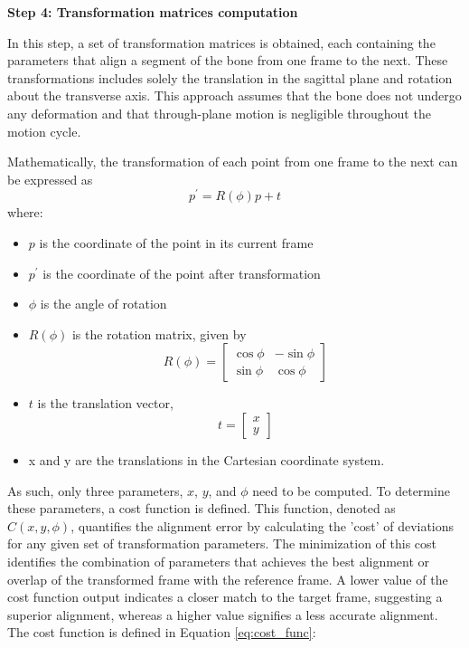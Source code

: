 \documentclass{micro-econ-thesis}
\begin{document}
\textbf{Step 4: Transformation matrices computation}

In this step, a set of transformation matrices is obtained, each containing the parameters that align a segment of the bone from one frame to the next. These transformations includes solely the translation in the sagittal plane and rotation about the transverse axis. This approach assumes that the bone does not undergo any deformation and that through-plane motion is negligible throughout the motion cycle. 

Mathematically, the transformation of each point from one frame to the next can be expressed as 
\begin{equation}
	p^{'} = R(\phi)p + t
	\label{eq:rot} 
\end{equation}
where: 
\begin{itemize}
	\item \textbf{$p$} is the coordinate of the point in its current frame
	\item \textbf{$p^{'}$} is the coordinate of the point after transformation
	\item $\phi$ is the angle of rotation
	\item \textbf{$R(\phi)$}  is the rotation matrix, given by 
	 \[
	 R(\phi) = 
	 \begin{bmatrix}
	 	\cos \phi & -\sin \phi \\
	 	\sin \phi & \cos \phi
	 \end{bmatrix}
	 \]
	 
	 \item $t$ is the translation vector,
	 	\[
	 	t = \begin{bmatrix}
	 		x \\
	 		y
	 	\end{bmatrix}
	 	\]
 	\item x and y are the translations in the Cartesian coordinate system. 
\end{itemize}   
As such, only three parameters, $x$, $y$, and $\phi$ need to be computed. To determine these parameters, a cost function is defined. This function, denoted as $C(x,y,\phi)$, quantifies the alignment error by calculating the 'cost' of deviations for any given set of transformation parameters. The minimization of this cost identifies the combination of parameters that achieves the best alignment or overlap of the transformed frame with the reference frame. A lower value of the cost function output indicates a closer match to the target frame, suggesting a superior alignment, whereas a higher value signifies a less accurate alignment. The cost function is defined in Equation \ref{eq:cost_func}:  
\end{document}
